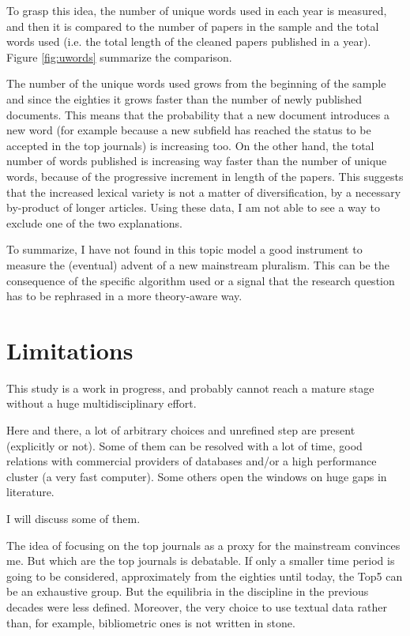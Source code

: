 \documentclass[a4paper, 11pt, headings=standardclasses, tablecaptionsbelow]{scrartcl}
\begin{document}
To grasp this idea, the number of unique words used in each year is measured, and then it is compared to the number of papers in the sample and the total words used (i.e. the total length of the cleaned papers published in a year). Figure \ref{fig:uwords} summarize the comparison.

The number of the unique words used grows from the beginning of the sample and since the eighties it grows faster than the number of newly published documents. This means that the probability that a new document introduces a new word (for example because a new subfield has reached the status to be accepted in the top journals) is increasing too. On the other hand, the total number of words published is increasing way faster than the number of unique words, because of the progressive increment in length of the papers. This suggests that the increased lexical variety is not a matter of diversification, by a necessary by-product of longer articles.
Using these data, I am not able to see a way to exclude one of the two explanations.

To summarize, I have not found in this topic model a good instrument to measure the (eventual) advent of a new mainstream pluralism. This can be the consequence of the specific algorithm used or a signal that the research question has to be rephrased in a more theory-aware way.

\section{Limitations}
This study is a work in progress, and probably cannot reach a mature stage without a huge multidisciplinary effort.

Here and there, a lot of arbitrary choices and unrefined step are present (explicitly or not).
Some of them can be resolved with a lot of time, good relations with commercial providers of databases and/or a high performance cluster (a very fast computer).
Some others open the windows on huge gaps in literature.

I will discuss some of them.

The idea of focusing on the top journals as a proxy for the mainstream convinces me. But which are the top journals is debatable.
If only a smaller time period is going to be considered, approximately from the eighties until today, the Top5 can be an exhaustive group. But the equilibria in the discipline in the previous decades were less defined.
Moreover, the very choice to use textual data rather than, for example, bibliometric ones is not written in stone.
\end{document}
